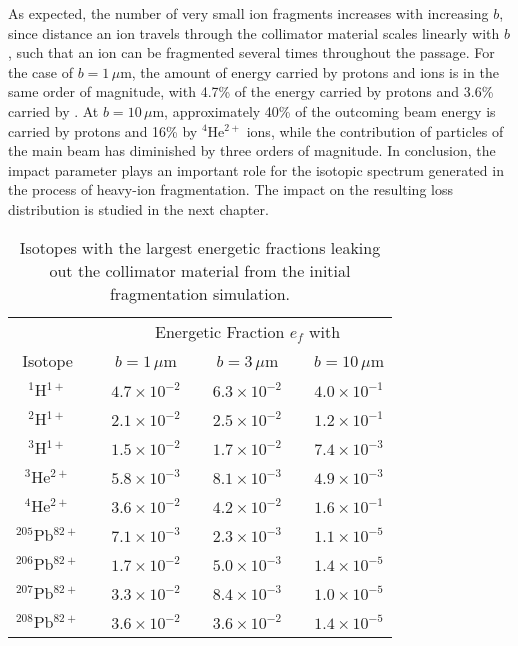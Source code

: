 As expected, the number of very small ion fragments increases with increasing $b$, since distance an ion travels through the collimator material scales linearly with $b$, such that an ion can be fragmented several times throughout the passage. For the case of $b=1\,\mu$m, the amount of energy carried by protons and \lead ions is in the same order of magnitude, with 4.7\% of the energy carried by protons and 3.6\% carried by \lead. At $b=10\,\mu$m, approximately 40\% of the outcoming beam energy is carried by protons and 16\% by $^4$He$^{2+}$ ions, while the contribution of particles of the main beam has diminished by three orders of magnitude. In conclusion, the impact parameter plays an important role for the isotopic spectrum generated in the process of heavy-ion fragmentation. The impact on the resulting loss distribution is studied in the next chapter.
%
%
\begin{table}[b]
\centering
\caption{Isotopes with the largest energetic fractions leaking out the collimator material from the initial fragmentation simulation. }
\small
\setlength\tabcolsep{2.5pt}
\label{tab:importance}
\begin{tabular}{ccccccc}
\toprule
          \multicolumn{1}{c}{}     &     &  \multicolumn{5}{c}{Energetic Fraction $e_f$ with}                    \\

\multicolumn{1}{c}{Isotope}       &   & \multicolumn{1}{c}{$b=1\,\mu$m} &            & \multicolumn{1}{c}{$b=3\,\mu$m}      &       & \multicolumn{1}{c}{$b=10\,\mu$m}            \\ \midrule
$^1$H$^{1+}$      & \phantom{a} & $4.7 \times 10^{-2}$ & \phantom{a} & $6.3 \times 10^{-2}$ & \phantom{a} & $4.0 \times 10^{-1}$  \\
$^2$H$^{1+}$      &  & $2.1 \times 10^{-2}$ & & $2.5 \times 10^{-2}$ & & $1.2 \times 10^{-1}$  \\
$^3$H$^{1+}$      &  & $1.5 \times 10^{-2}$ & & $1.7 \times 10^{-2}$ & & $7.4 \times 10^{-3}$  \\
$^3$He$^{2+}$     &  & $5.8 \times 10^{-3}$ & & $8.1 \times 10^{-3}$ & & $4.9 \times 10^{-3}$ \\
$^4$He$^{2+}$     &  & $3.6 \times 10^{-2}$ & & $4.2 \times 10^{-2}$ & & $1.6 \times 10^{-1}$  \\
$^{205}$Pb$^{82+}$&  & $7.1 \times 10^{-3}$ & & $2.3 \times 10^{-3}$ & & $1.1 \times 10^{-5}$  \\
$^{206}$Pb$^{82+}$&  & $1.7 \times 10^{-2}$ & & $5.0 \times 10^{-3}$ & & $ 1.4 \times 10^{-5}$ \\
$^{207}$Pb$^{82+}$&  & $3.3 \times 10^{-2}$ & & $ 8.4\times 10^{-3}$ & & $1.0 \times 10^{-5}$  \\
$^{208}$Pb$^{82+}$&  & $3.6 \times 10^{-2}$ & & $3.6\times 10^{-2}$  & & $1.4 \times 10^{-5}$  \\

\bottomrule
\end{tabular}
\end{table}
%
%
%

